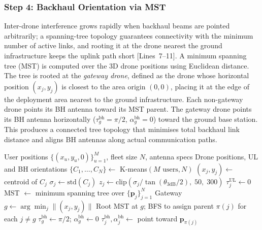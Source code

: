\documentclass[conference]{IEEEtran}
\newcommand{\vect}[1]{\bm{#1}}
\newcommand{\posv}[1]{\vect{p}_{#1}}
\begin{document}
\subsubsection{Step 4: Backhaul Orientation via MST}
Inter-drone interference grows rapidly when backhaul beams are pointed arbitrarily; a spanning-tree topology guarantees connectivity with the minimum number of active links, and rooting it at the drone nearest the ground infrastructure keeps the uplink path short [Lines~7--11].
A minimum spanning tree (MST) is computed over the 3D drone positions using Euclidean distance. The tree is rooted at the \emph{gateway drone}, defined as the drone whose horizontal position $(x_j, y_j)$ is closest to the area origin $(0,0)$, placing it at the edge of the deployment area nearest to the ground infrastructure.
Each non-gateway drone points its BH antenna toward its MST parent. The gateway drone points its BH antenna horizontally ($\tau_g^{\mathrm{bh}} = \pi/2$, $\alpha_g^{\mathrm{bh}} = 0$) toward the ground base station. This produces a connected tree topology that minimises total backhaul link distance and aligns BH antennas along actual communication paths.

\begin{algorithm}[ht]
\caption{Analytic Geometry-Based Deployment}
\label{alg:analytic}
\begin{algorithmic}[1]
\REQUIRE User positions $\{(x_u, y_u, 0)\}_{u=1}^{M}$, fleet size $N$, antenna specs
\ENSURE Drone positions, UL and BH orientations
\STATE $\{C_1, \ldots, C_N\} \leftarrow$ K-means$(M \text{ users}, N)$
    \STATE $(x_j, y_j) \leftarrow$ centroid of $C_j$
    \STATE $\sigma_j \leftarrow \mathrm{std}(C_j)$
    \STATE $z_j \leftarrow \mathrm{clip}\!\left(\sigma_j / \tan(\theta_{3\mathrm{dB}}/2),\; 50,\; 300\right)$
    \STATE $\tau_j^{\mathrm{UL}} \leftarrow 0$ 
\ENDFOR
\STATE MST $\leftarrow$ minimum spanning tree over $\{\posv{j}\}_{j=1}^{N}$
\STATE Gateway $g \leftarrow \arg\min_j \|(x_j, y_j)\|$ 
\STATE Root MST at $g$; BFS to assign parent $\pi(j)$ for each $j \neq g$
\STATE $\tau_g^{\mathrm{bh}} \leftarrow \pi/2$;\; $\alpha_g^{\mathrm{bh}} \leftarrow 0$ 
    \STATE $\tau_j^{\mathrm{bh}}, \alpha_j^{\mathrm{bh}} \leftarrow$ point toward $\posv{\pi(j)}$
\ENDFOR
\end{algorithmic}
\end{algorithm}
\end{document}
